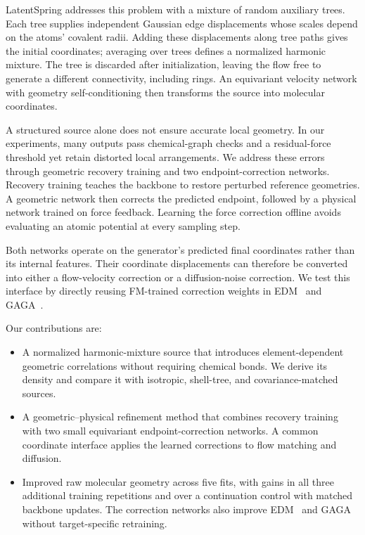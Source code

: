 \documentclass{article}
\begin{document}
LatentSpring addresses this problem with a mixture of random auxiliary trees. Each tree supplies independent Gaussian edge displacements whose scales depend on the atoms' covalent radii. Adding these displacements along tree paths gives the initial coordinates; averaging over trees defines a normalized harmonic mixture. The tree is discarded after initialization, leaving the flow free to generate a different connectivity, including rings. An equivariant velocity network with geometry self-conditioning then transforms the source into molecular coordinates.

A structured source alone does not ensure accurate local geometry. In our experiments, many outputs pass chemical-graph checks and a residual-force threshold yet retain distorted local arrangements. We address these errors through geometric recovery training and two endpoint-correction networks. Recovery training teaches the backbone to restore perturbed reference geometries. A geometric network then corrects the predicted endpoint, followed by a physical network trained on force feedback. Learning the force correction offline avoids evaluating an atomic potential at every sampling step.

Both networks operate on the generator's predicted final coordinates rather than its internal features. Their coordinate displacements can therefore be converted into either a flow-velocity correction or a diffusion-noise correction. We test this interface by directly reusing FM-trained correction weights in EDM~\citep{edm} and GAGA~\citep{qu2026gaga}.

Our contributions are:
\begin{itemize}
\item A normalized harmonic-mixture source that introduces element-dependent geometric correlations without requiring chemical bonds. We derive its density and compare it with isotropic, shell-tree, and covariance-matched sources.
\item A geometric--physical refinement method that combines recovery training with two small equivariant endpoint-correction networks. A common coordinate interface applies the learned corrections to flow matching and diffusion.
\item Improved raw molecular geometry across five fits, with gains in all three additional training repetitions and over a continuation control with matched backbone updates. The correction networks also improve EDM~\citep{edm} and GAGA~\citep{qu2026gaga} without target-specific retraining.
\end{itemize}
\end{document}
